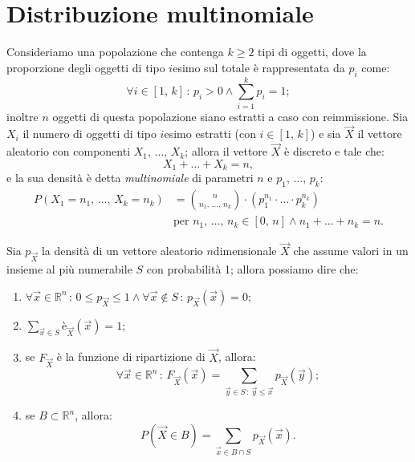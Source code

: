     \section{Distribuzione multinomiale}
        \begin{defn}\label{defn:Densità_multinomiale}
            Consideriamo una popolazione che contenga $k \geq 2$ tipi di oggetti, dove la proporzione degli oggetti di tipo  $i$\nbdash esimo sul totale è rappresentata da $p_i$ come:  \[
                \forall i \in [1,\, k] \,:\, p_i > 0 \land \sum_{i=1}^{k} p_i = 1
            ;\] inoltre $n$ oggetti di questa popolazione siano estratti a caso con reimmissione.
            Sia $X_i$ il numero di oggetti di tipo $i$\nbdash esimo estratti (con $i \in [1,\, k]$) e sia $\vec{X}$ il vettore aleatorio con componenti $X_1,\, \ldots,\, X_{k}$; allora il vettore $\vec{X}$ è discreto e tale che: \[
            X_1 + \ldots + X_{k} = n
            ,\] e la sua densità è detta \emph{multinomiale} di parametri $n$ e $p_1,\, \ldots,\, p_{k}$:
            \begin{align}\label{eq:Densità_multinomiale}
                P(X_1 = n_1,\, \ldots,\, X_{k} = n_k) &= \binom{n}{n_1,\, \ldots,\, n_{k}} \cdot (p_1^{n_1} \cdot \ldots \cdot p^{n_k}_{k}) \\
                                                      & \text{per } n_1,\, \ldots,\, n_{k} \in [0,\, n] \land n_1 + \ldots + n_k = n \nonumber
            .\end{align}
        \end{defn}
        \begin{prty}\label{prty:Densità_congiunta}
            Sia $p_{\vec{X}}$ la densità di un vettore aleatorio $n$\nbdash dimensionale $\vec{X}$ che assume valori in un insieme al più numerabile $S$ con probabilità 1; allora possiamo dire che:
            \begin{enumerate}
                \item $\forall \vec{x} \in \mathbb{R}^n \,:\, 0 \leq p_{\vec{X}} \leq 1 \land 
                    \forall \vec{x} \notin S \,:\, p_{\vec{X}}(\vec{x}) = 0$;
                \item $\sum_{\vec{x} \in S} è_{\vec{X}}(\vec{x}) = 1$;
                \item se $F_{\vec{X}}$ è la funzione di ripartizione di $\vec{X}$, allora: \[
                    \forall \vec{x} \in \mathbb{R}^n \,:\, F_{\vec{X}}(\vec{x}) = \!\!\!\! \sum_{\vec{y} \in S \,:\, \vec{y} \leq \vec{x}} \!\!\!\! p_{\vec{X}}(\vec{y})
                ;\] 
                \item se $B \subset \mathbb{R}^n$, allora: \[
                        P(\vec{X} \in B) = \!\!\! \sum_{\vec{x} \in B \cap S} \!\!\! p_{\vec{X}}(\vec{x})
                .\] 
            \end{enumerate}
        \end{prty}
